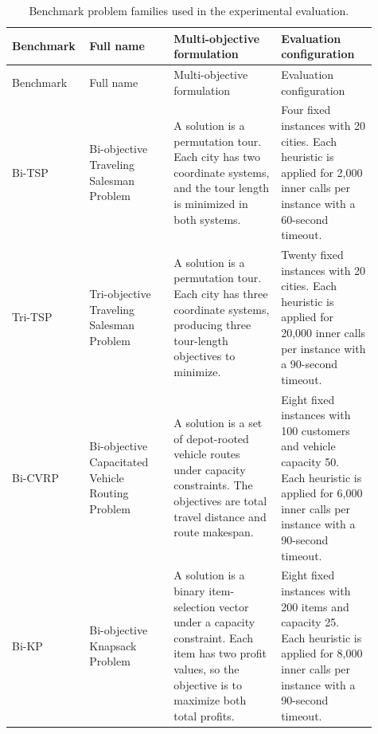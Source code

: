 \begingroup
\small
\renewcommand{\arraystretch}{1.12}
\setlength{\tabcolsep}{4pt}
\begin{longtable}{@{}>{\raggedright\arraybackslash}p{0.15\linewidth}>{\raggedright\arraybackslash}p{0.22\linewidth}>{\raggedright\arraybackslash}p{0.29\linewidth}>{\raggedright\arraybackslash}p{0.25\linewidth}@{}}
\caption[Benchmark problem families]{Benchmark problem families used in the experimental evaluation.}
\label{tab:benchmark-problems}\\
\toprule
Benchmark & Full name & Multi-objective formulation & Evaluation configuration \\
\midrule
\endfirsthead
\toprule
Benchmark & Full name & Multi-objective formulation & Evaluation configuration \\
\midrule
\endhead
Bi-TSP & Bi-objective Traveling Salesman Problem & A solution is a permutation tour. Each city has two coordinate systems, and the tour length is minimized in both systems. & Four fixed instances with 20 cities. Each heuristic is applied for 2,000 inner calls per instance with a 60-second timeout. \\
Tri-TSP & Tri-objective Traveling Salesman Problem & A solution is a permutation tour. Each city has three coordinate systems, producing three tour-length objectives to minimize. & Twenty fixed instances with 20 cities. Each heuristic is applied for 20,000 inner calls per instance with a 90-second timeout. \\
Bi-CVRP & Bi-objective Capacitated Vehicle Routing Problem & A solution is a set of depot-rooted vehicle routes under capacity constraints. The objectives are total travel distance and route makespan. & Eight fixed instances with 100 customers and vehicle capacity 50. Each heuristic is applied for 6,000 inner calls per instance with a 90-second timeout. \\
Bi-KP & Bi-objective Knapsack Problem & A solution is a binary item-selection vector under a capacity constraint. Each item has two profit values, so the objective is to maximize both total profits. & Eight fixed instances with 200 items and capacity 25. Each heuristic is applied for 8,000 inner calls per instance with a 90-second timeout. \\
\bottomrule
\end{longtable}
\endgroup
